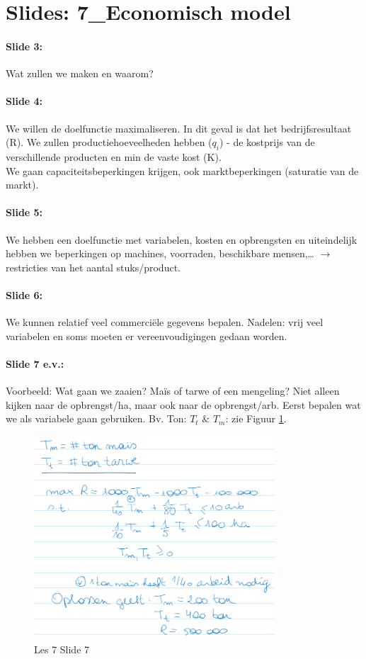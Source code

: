 \documentclass[10pt,a4paper]{report}
\begin{document}
\section{Slides: 7\_Economisch model}

\paragraph{Slide 3:} Wat zullen we maken en waarom?

\paragraph{Slide 4:} We willen de doelfunctie maximaliseren. In dit geval is dat het bedrijfsresultaat (R). We zullen productiehoeveelheden hebben ($q_{i}$) - de kostprijs van de verschillende producten en min de vaste kost (K).\\
We gaan capaciteitsbeperkingen krijgen, ook marktbeperkingen (saturatie van de markt).

\paragraph{Slide 5:} We hebben een doelfunctie met variabelen, kosten en opbrengsten en uiteindelijk hebben we beperkingen op machines, voorraden, beschikbare mensen,… $\rightarrow$ restricties van het aantal stuks/product.

\paragraph{Slide 6:} We kunnen relatief veel commerci\"ele gegevens bepalen. Nadelen: vrij veel variabelen en soms moeten er vereenvoudigingen gedaan worden.

\paragraph{Slide 7 e.v.:} Voorbeeld: Wat gaan we zaaien? Ma\"is of tarwe of een mengeling? Niet alleen kijken naar de opbrengst/ha, maar ook naar de opbrengst/arb. Eerst bepalen wat we als variabele gaan gebruiken. Bv. Ton: $T_{t}$ $\&$ $T_{m}$: zie Figuur \ref{les07_02}.

\begin{figure}[h!]
\centering
\includegraphics[width=90mm]{Les07_02.png}
\caption{Les 7 Slide 7} 
\label{les07_02}
\end{figure}
\end{document}
